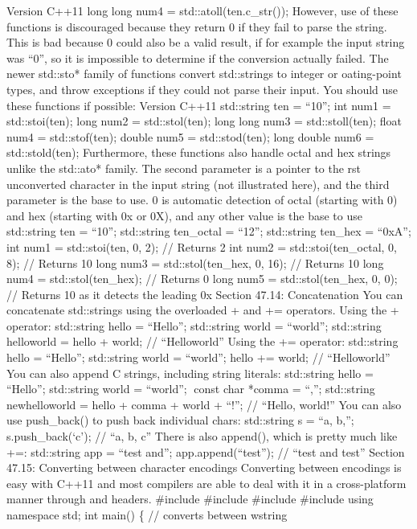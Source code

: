 Version C++11 long long num4 = std::atoll(ten.c\_str()); However, use of
these functions is discouraged because they return 0 if they fail to
parse the string. This is bad because 0 could also be a valid result, if
for example the input string was ``0'', so it is impossible to determine
if the conversion actually failed. The newer std::sto* family of
functions convert std::strings to integer or oating-point types, and
throw exceptions if they could not parse their input. You should use
these functions if possible: Version C++11 std::string ten = ``10''; int
num1 = std::stoi(ten); long num2 = std::stol(ten); long long num3 =
std::stoll(ten); float num4 = std::stof(ten); double num5 =
std::stod(ten); long double num6 = std::stold(ten); Furthermore, these
functions also handle octal and hex strings unlike the std::ato* family.
The second parameter is a pointer to the rst unconverted character in
the input string (not illustrated here), and the third parameter is the
base to use. 0 is automatic detection of octal (starting with 0) and hex
(starting with 0x or 0X), and any other value is the base to use
std::string ten = ``10''; std::string ten\_octal = ``12''; std::string
ten\_hex = ``0xA''; int num1 = std::stoi(ten, 0, 2); // Returns 2 int
num2 = std::stoi(ten\_octal, 0, 8); // Returns 10 long num3 =
std::stol(ten\_hex, 0, 16); // Returns 10 long num4 =
std::stol(ten\_hex); // Returns 0 long num5 = std::stol(ten\_hex, 0, 0);
// Returns 10 as it detects the leading 0x Section 47.14: Concatenation
You can concatenate std::strings using the overloaded + and +=
operators. Using the + operator: std::string hello = ``Hello'';
std::string world = ``world''; std::string helloworld = hello + world;
// ``Helloworld'' Using the += operator: std::string hello = ``Hello'';
std::string world = ``world''; hello += world; // ``Helloworld'' You can
also append C strings, including string literals: std::string hello =
``Hello''; std::string world = ``world''; const char *comma = ``,'';
std::string newhelloworld = hello + comma + world + ``!''; // ``Hello,
world!'' You can also use push\_back() to push back individual chars:
std::string s = ``a, b,''; s.push\_back(`c'); // ``a, b, c'' There is
also append(), which is pretty much like +=: std::string app = ``test
and''; app.append(``test''); // ``test and test'' Section 47.15:
Converting between character encodings Converting between encodings is
easy with C++11 and most compilers are able to deal with it in a
cross-platform manner through and headers. \#include \#include \#include
\#include using namespace std; int main() \{ // converts between wstring
